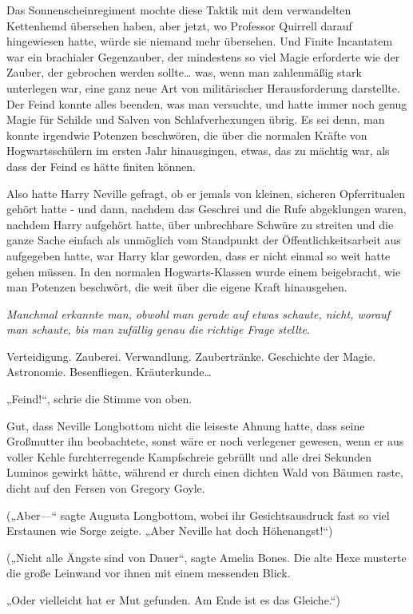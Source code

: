 {Das Sonnenscheinregiment mochte diese Taktik mit dem verwandelten Kettenhemd übersehen haben, aber jetzt, wo Professor Quirrell darauf hingewiesen hatte, würde sie niemand mehr übersehen. Und Finite Incantatem war ein brachialer Gegenzauber, der mindestens so viel Magie erforderte wie der Zauber, der gebrochen werden sollte… was, wenn man zahlenmäßig stark unterlegen war, eine ganz neue Art von militärischer Herausforderung darstellte. Der Feind konnte alles beenden, was man versuchte, und hatte immer noch genug Magie für Schilde und Salven von Schlafverhexungen übrig. Es sei denn, man konnte irgendwie Potenzen beschwören, die über die normalen Kräfte von Hogwartsschülern im ersten Jahr hinausgingen, etwas, das zu mächtig war, als dass der Feind es hätte finiten können.

Also hatte Harry Neville gefragt, ob er jemals von kleinen, sicheren Opferritualen gehört hatte - und dann, nachdem das Geschrei und die Rufe abgeklungen waren, nachdem Harry aufgehört hatte, über unbrechbare Schwüre zu streiten und die ganze Sache einfach als unmöglich vom Standpunkt der Öffentlichkeitsarbeit aus aufgegeben hatte, war Harry klar geworden, dass er nicht einmal so weit hatte gehen müssen. In den normalen Hogwarts-Klassen wurde einem beigebracht, wie man Potenzen beschwört, die weit über die eigene Kraft hinausgehen.

\emph{Manchmal erkannte man, obwohl man gerade auf etwas schaute, nicht, worauf man schaute, bis man zufällig genau die richtige Frage stellte}.

Verteidigung. Zauberei. Verwandlung. Zaubertränke. Geschichte der Magie. Astronomie. Besenfliegen. Kräuterkunde…

„Feind!“, schrie die Stimme von oben.

Gut, dass Neville Longbottom nicht die leiseste Ahnung hatte, dass seine Großmutter ihn beobachtete, sonst wäre er noch verlegener gewesen, wenn er aus voller Kehle furchterregende Kampfschreie gebrüllt und alle drei Sekunden Luminos gewirkt hätte, während er durch einen dichten Wald von Bäumen raste, dicht auf den Fersen von Gregory Goyle.

(„Aber—“ sagte Augusta Longbottom, wobei ihr Gesichtsausdruck fast so viel Erstaunen wie Sorge zeigte. „Aber Neville hat doch Höhenangst!“)

(„Nicht alle Ängste sind von Dauer“, sagte Amelia Bones. Die alte Hexe musterte die große Leinwand vor ihnen mit einem messenden Blick.

„Oder vielleicht hat er Mut gefunden. Am Ende ist es das Gleiche.“)

}
